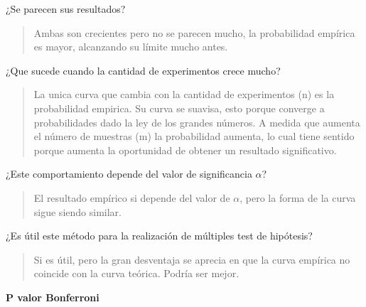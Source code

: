 \documentclass[]{article}
\begin{document}
¿Se parecen sus resultados?

\begin{quote}
Ambas son crecientes pero no se parecen mucho, la probabilidad empírica
es mayor, alcanzando su límite mucho antes.
\end{quote}

¿Que sucede cuando la cantidad de experimentos crece mucho?

\begin{quote}
La unica curva que cambia con la cantidad de experimentos (n) es la
probabilidad empirica. Su curva se suavisa, esto porque converge a
probabilidades dado la ley de los grandes números. A medida que aumenta
el número de muestras (m) la probabilidad aumenta, lo cual tiene sentido
porque aumenta la oportunidad de obtener un resultado significativo.
\end{quote}

¿Este comportamiento depende del valor de significancia \(\alpha\)?

\begin{quote}
El resultado empírico si depende del valor de \(\alpha\), pero la forma
de la curva sigue siendo similar.
\end{quote}

¿Es útil este método para la realización de múltiples test de hipótesis?

\begin{quote}
Si es útil, pero la gran desventaja se aprecia en que la curva empírica
no coincide con la curva teórica. Podría ser mejor.
\end{quote}

\textbf{P valor Bonferroni}
\end{document}
